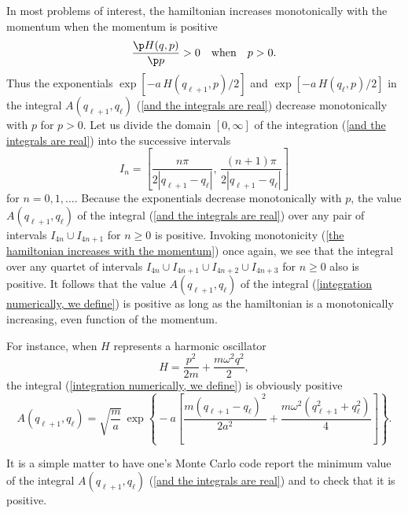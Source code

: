 \documentclass[prd,preprint,floatfix,showpacs]{revtex4-1}
\begin{document}
In most problems of interest,
the hamiltonian increases monotonically
with the momentum when the momentum
is positive
\begin{equation}
\frac{\p H(q, p)}{\p p} > 0 
\quad \mbox{when} \quad p > 0 .
\label {the hamiltonian increases with the momentum}
\end{equation}
Thus
the exponentials \( \exp[ - a \, H(q_{\ell+1}, p)/2 ] \)
and \( \exp[ - a \, H(q_\ell, p)/2 ] \)
in the integral \( A(q_{\ell + 1}, q_\ell) \) 
(\ref {and the integrals are real})
decrease monotonically with \( p \)
for \( p > 0 \)\@.
Let us divide the domain \( [0, \infty ] \)
of the integration (\ref {and the integrals are real})
into the successive intervals 
\begin{equation}
I_n ={} \left[ \frac{n \pi}{2 | q_{\ell+1} - q_\ell |}, \,
 \frac{(n + 1)\pi}{2 | q_{\ell+1} - q_\ell |} \right] 
\label {if one divides the half line}
\end{equation}
for \( n = 0, 1, \dots \)\@.
Because the
exponentials decrease monotonically
with \( p \),
the value  \( A(q_{\ell + 1}, q_\ell) \)
of the integral (\ref {and the integrals are real})
over any pair of intervals
\( I_{4n} \cup I_{4n+1} \) for \( n \ge 0 \)
is positive.  Invoking monotonicity
(\ref {the hamiltonian increases with the momentum})
once again, we see that the integral over 
any quartet of intervals
\( I_{4n} \cup I_{4n+1} \cup I_{4n+2} \cup I_{4n+3}\) 
for \( n \ge 0 \) also is positive. 
It follows that the value \( A(q_{\ell + 1}, q_\ell) \) 
of the integral 
(\ref {integration numerically, we define})
is positive as long as the hamiltonian is 
a monotonically increasing, 
even function of the momentum.
\par
\par
For instance, when \( H \)
represents a harmonic oscillator
\begin{equation}
H ={} \frac{p^2}{2m} + \frac{m \omega^2 q^2}{2},
\label {H represents a harmonic oscillator}
\end{equation}
the integral 
(\ref {integration numerically, we define})
is obviously positive
\begin{equation}
A(q_{\ell+1}, q_\ell) = {} \sqrt{\frac{m}{a}}
\, \exp\left\{ {} - a 
\left[\frac{m (q_{\ell+1} - q_\ell)^2}{2 a^2}
+ \frac{m\omega^2 ( q_{\ell+1}^2 + q_\ell^2)}{4} 
\right] \right\} .
\label {the integral is}
\end{equation}
\par
It is a simple matter to
have one's Monte Carlo code
report the minimum 
value of the integral \( A(q_{\ell + 1}, q_\ell) \) 
(\ref {and the integrals are real})
and to check that it is positive.


\end{document}
